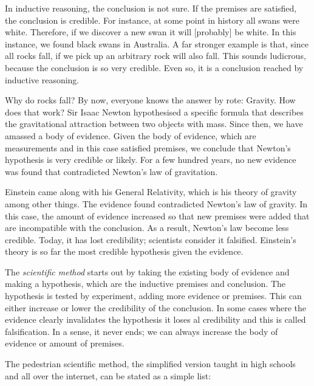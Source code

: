 \begin{multicols}{2}
In inductive reasoning, the conclusion is not sure. If the premises are satisfied, the conclusion is credible. For instance, at some point in
history all swans were white. Therefore, if we discover a new swan it will [probably] be white. In this instance, we found black swans in Australia.
A far stronger example is that, since all rocks fall, if we pick up an arbitrary rock will also fall. This sounds ludicrous, because the conclusion
is so very credible. Even so, it is a conclusion reached by inductive reasoning.


Why do rocks fall? By now, everyone knows the answer by rote: Gravity. How does that work? Sir Isaac Newton hypothesised a specific formula that
describes the gravitational attraction between two objects with mass. Since then, we have amassed a body of evidence. Given the body of evidence,
which are measurements and in this case satisfied premises, we conclude that Newton's hypothesis is very credible or likely. For a few hundred
years, no new evidence was found that contradicted Newton's law of gravitation.


Einstein came along with his General Relativity, which is his theory of gravity among other things. The evidence found contradicted Newton's law
of gravity. In this case, the amount of evidence increased so that new premises were added that are incompatible with the conclusion. As a result,
Newton's law become less credible. Today, it has lost credibility; scientists consider it falsified. Einstein's theory is so far the most credible
hypothesis given the evidence.


The \emph{scientific method} starts out by taking the existing body of evidence and making a hypothesis, which are the inductive premises and
conclusion. The hypothesis is tested by experiment, adding more evidence or premises. This can either increase or lower the credibility of the 
conclusion. In some cases where the evidence clearly invalidates the hypothesis it loses al credibility and this is called falsification. In a sense,
it never ends; we can always increase the body of evidence or amount of premises.


The pedestrian scientific method, the simplified version taught in high schools and all over the internet, can be stated as a simple list:

\begin{itemize}
\end{itemize}


\end{multicols}
